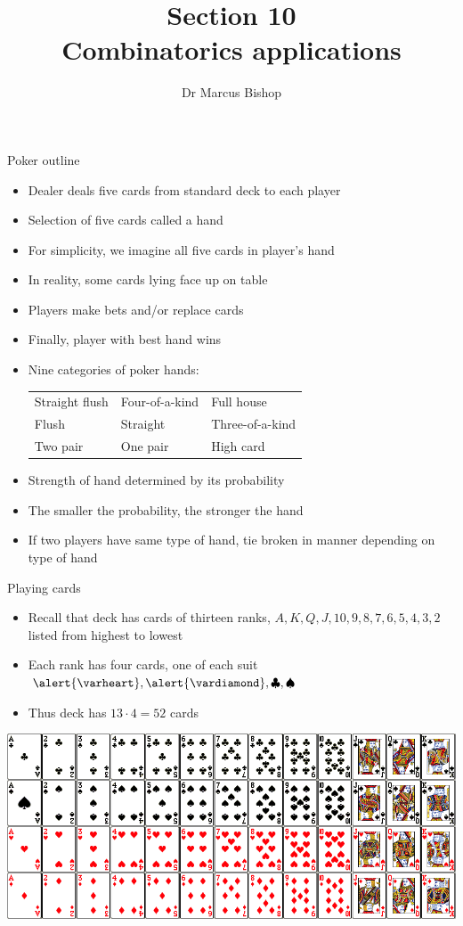 \documentclass{beamer}
\title[\S10]{Section 10\\Combinatorics applications}
\author{Dr Marcus Bishop}
\theoremstyle{definition}
\newcommand{\hs}{\alert{\varheart}}
\newcommand{\ds}{\alert{\vardiamond}}
\newcommand{\s}{\spadesuit}
\newcommand{\cs}{\clubsuit}
\begin{document}
\begin{frame}\titlepage\end{frame}
\LogoOff

\begin{frame}{Poker outline}
\begin{itemize}
\item Dealer deals five cards from standard deck
to each player
\item Selection of five cards called a \alert{hand}
\item For simplicity, we imagine all five cards in player's hand
\item In reality, some cards lying face up on table
\item Players make bets and/or replace cards
\item Finally, player with \alert{best hand} wins
\item Nine categories of poker hands:
\begin{tabular}{lll}
Straight flush&Four-of-a-kind&Full house\\
Flush&Straight&Three-of-a-kind\\
Two pair&One pair&High card
\end{tabular}
\item Strength of hand determined by its probability
\item The smaller the probability, the stronger the hand
\item If two players have same type of hand, tie
broken in manner depending on type of hand
\end{itemize}
\end{frame}

\begin{frame}{Playing cards}
\begin{itemize}
\item Recall that deck has cards of thirteen \alert{ranks},
$A,K,Q,J,10,9,8,7,6,5,4,3,2$
listed from highest to lowest
\item Each rank has four cards, one of each \alert{suit} $\hs,\ds,\cs,\s$
\item Thus deck has $13\cdot 4=52$ cards
\end{itemize}
\includegraphics[scale=.3]{cards}
\end{frame}
\end{document}
